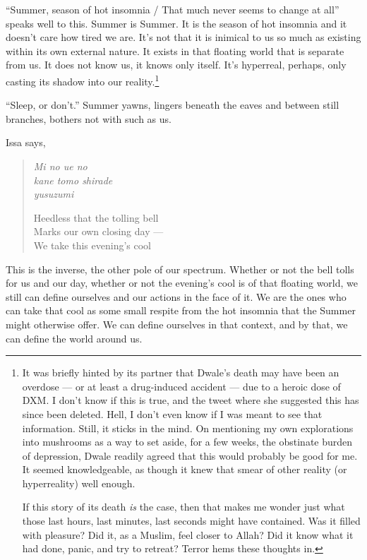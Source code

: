 \documentclass[12pt,oneside]{memoir}
\begin{document}
``Summer, season of hot insomnia / That much never seems to change at all'' speaks well to this. Summer is Summer. It is the season of hot insomnia and it doesn't care how tired we are. It's not that it is inimical to us so much as existing within its own external nature. It exists in that floating world that is separate from us. It does not know us, it knows only itself. It's hyperreal, perhaps, only casting its shadow into our reality.\footnote{It was briefly hinted by its partner that Dwale's death may have been an overdose --- or at least a drug-induced accident --- due to a heroic dose of DXM. I don't know if this is true, and the tweet where she suggested this has since been deleted. Hell, I don't even know if I was meant to see that information. Still, it sticks in the mind. On mentioning my own explorations into mushrooms as a way to set aside, for a few weeks, the obstinate burden of depression, Dwale readily agreed that this would probably be good for me. It seemed knowledgeable, as though it knew that smear of other reality (or hyperreality) well enough.\par If this story of its death \emph{is} the case, then that makes me wonder just what those last hours, last minutes, last seconds might have contained. Was it filled with pleasure? Did it, as a Muslim, feel closer to Allah? Did it know what it had done, panic, and try to retreat? Terror hems these thoughts in.} 

``Sleep, or don't.'' Summer yawns, lingers beneath the eaves and between still branches, bothers not with such as us.

Issa says,

\begin{verse}
\begin{multicols}{2}
\emph{Mi no ue no} \\
\emph{kane tomo shirade} \\
\emph{yusuzumi} 

\columnbreak

Heedless that the tolling bell \\
Marks our own closing day --- \\
We take this evening's cool
\end{multicols}
\parencite[39]{issa}
\end{verse}

This is the inverse, the other pole of our spectrum. Whether or not the bell tolls for us and our day, whether or not the evening's cool is of that floating world, we still can define ourselves and our actions in the face of it. We are the ones who can take that cool as some small respite from the hot insomnia that the Summer might otherwise offer. We can define ourselves in that context, and by that, we can define the world around us.
\end{document}
